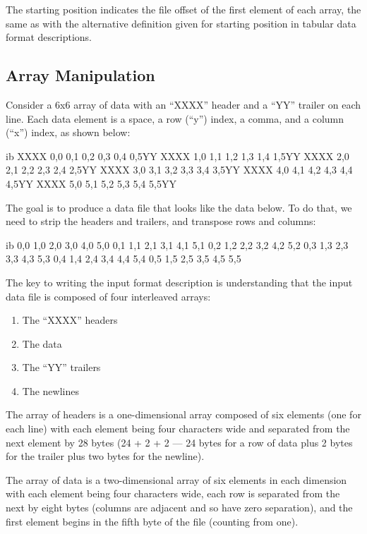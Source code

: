 The starting position indicates the file offset of the first element
of each array, the same as with the alternative definition given for
starting position in tabular data format descriptions.

\subsection{Array Manipulation}

Consider a 6x6 array of data with an ``XXXX'' header and a ``YY''
trailer on each line.  Each data element is a space, a row (``y'')
index, a comma, and a column (``x'') index, as shown below:

\begin{vcode}{ib}
XXXX 0,0 0,1 0,2 0,3 0,4 0,5YY
XXXX 1,0 1,1 1,2 1,3 1,4 1,5YY
XXXX 2,0 2,1 2,2 2,3 2,4 2,5YY
XXXX 3,0 3,1 3,2 3,3 3,4 3,5YY
XXXX 4,0 4,1 4,2 4,3 4,4 4,5YY
XXXX 5,0 5,1 5,2 5,3 5,4 5,5YY 
\end{vcode}

The goal is to produce a data file that looks like the data below. To
do that, we need to strip the headers and trailers, and transpose rows
and columns:

\begin{vcode}{ib}
0,0 1,0 2,0 3,0 4,0 5,0
0,1 1,1 2,1 3,1 4,1 5,1
0,2 1,2 2,2 3,2 4,2 5,2
0,3 1,3 2,3 3,3 4,3 5,3
0,4 1,4 2,4 3,4 4,4 5,4
0,5 1,5 2,5 3,5 4,5 5,5 
\end{vcode}

The key to writing the input format description is understanding that
the input data file is composed of four interleaved arrays:

\begin{enumerate}
\item The ``XXXX'' headers  

\item The data  

\item The ``YY'' trailers  

\item The newlines  
\end{enumerate}

The array of headers is a one-dimensional array composed of six
elements (one for each line) with each element being four characters
wide and separated from the next element by 28 bytes (24 + 2 + 2 ---
24 bytes for a row of data plus 2 bytes for the trailer plus two bytes
for the newline).

The array of data is a two-dimensional array of six elements in each
dimension with each element being four characters wide, each row is
separated from the next by eight bytes (columns are adjacent and so
have zero separation), and the first element begins in the fifth byte
of the file (counting from one).

